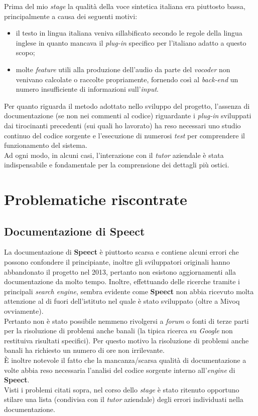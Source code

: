Prima del mio \textit{stage} la qualità della voce sintetica italiana era piuttosto bassa, principalmente a causa
dei seguenti motivi:
 \begin{itemize}
   \item il testo in lingua italiana veniva sillabificato secondo le regole della lingua inglese
         in quanto mancava il \textit{plug-in} specifico per l'italiano adatto a questo scopo;
   \item molte \textit{feature} utili alla produzione dell'audio da parte del \textit{vocoder} non venivano calcolate
         o raccolte propriamente, fornendo così al \textit{back-end} un numero insufficiente di informazioni sull'\textit{input}.
 \end{itemize}
Per quanto riguarda il metodo adottato nello sviluppo del progetto, l'assenza di documentazione (se non nei commenti al codice) 
riguardante i \textit{plug-in} sviluppati dai tirocinanti precedenti (sui quali ho lavorato) ha reso necessari uno studio continuo del 
codice sorgente e l'esecuzione di numerosi \textit{test} per comprendere il funzionamento del sistema. \\ 
Ad ogni modo, in alcuni casi, l'interazione con il \textit{tutor} aziendale è stata
indispensabile e fondamentale per la comprensione dei dettagli più ostici.


\section{Problematiche riscontrate}
 \subsection{Documentazione di Speect}
  La documentazione di \textbf{Speect} è piuttosto scarsa e contiene alcuni errori che possono confondere il principiante, inoltre
  gli sviluppatori originali hanno abbandonato il progetto nel 2013, pertanto non esistono aggiornamenti alla documentazione da molto tempo.
  Inoltre, effettuando delle ricerche tramite i principali \textit{search engine}, sembra evidente come \textbf{Speect} non abbia ricevuto molta attenzione
  al di fuori dell'istituto nel quale è stato sviluppato (oltre a Mivoq ovviamente). \\ Pertanto non è stato possibile nemmeno 
  rivolgersi a \textit{forum} o fonti di terze parti per la risoluzione di problemi anche banali (la tipica ricerca su 
  \textit{Google} non restituiva risultati specifici). Per questo motivo la risoluzione di problemi anche banali
  ha richiesto un numero di ore non irrilevante. \\
  È inoltre notevole il fatto che la mancanza/scarsa qualità di documentazione a volte abbia reso necessaria l'analisi del codice sorgente 
  interno all'\textit{engine} di \textbf{Speect}. \\
  Visti i problemi citati sopra, nel corso dello \textit{stage} è stato ritenuto opportuno stilare una lista 
  (condivisa con il \textit{tutor} aziendale) degli errori individuati nella documentazione.
  
